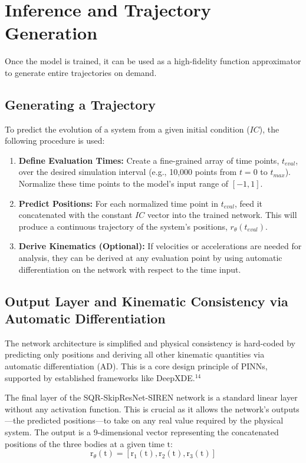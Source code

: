 \section{Inference and Trajectory Generation}

Once the model is trained, it can be used as a high-fidelity function approximator to generate entire trajectories on demand.

\subsection{Generating a Trajectory}
To predict the evolution of a system from a given initial condition ($IC$), the following procedure is used:
\begin{enumerate}
    \item \textbf{Define Evaluation Times:} Create a fine-grained array of time points, $t_{eval}$, over the desired simulation interval (e.g., 10,000 points from $t=0$ to $t_{max}$). Normalize these time points to the model's input range of $[-1, 1]$.
    \item \textbf{Predict Positions:} For each normalized time point in $t_{eval}$, feed it concatenated with the constant $IC$ vector into the trained network. This will produce a continuous trajectory of the system's positions, $r_{\theta}(t_{eval})$.
    \item \textbf{Derive Kinematics (Optional):} If velocities or accelerations are needed for analysis, they can be derived at any evaluation point by using automatic differentiation on the network with respect to the time input.
\end{enumerate}





\subsection{Output Layer and Kinematic Consistency via Automatic Differentiation}


The network architecture is simplified and physical consistency is hard-coded by predicting only positions and deriving all other kinematic quantities via automatic differentiation (AD). This is a core design principle of PINNs, supported by established frameworks like DeepXDE.$^{14}$

The final layer of the SQR-SkipResNet-SIREN network is a standard linear layer without any activation function. This is crucial as it allows the network's outputs—the predicted positions—to take on any real value required by the physical system. The output is a 9-dimensional vector representing the concatenated positions of the three bodies at a given time $\mathrm{t}$:
\[
\mathrm{r}_\theta(\mathrm{t}) = [\mathrm{r}_1(\mathrm{t}), \mathrm{r}_2(\mathrm{t}), \mathrm{r}_3(\mathrm{t})]
\]

